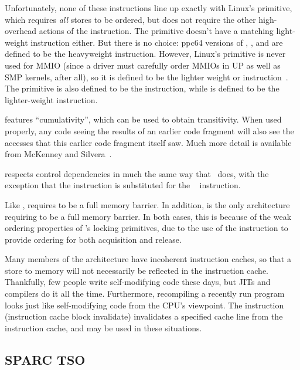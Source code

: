 Unfortunately, none of these instructions line up exactly with Linux's
 primitive, which requires \emph{all} stores to be ordered,
but does not require the other high-overhead actions of the 
instruction.
The  primitive doesn't have a matching light-weight instruction
either.
But there is no choice:
{ppc64} versions of , , and  are defined
to be the heavyweight  instruction.
However, Linux's  primitive is never used for MMIO
(since a driver must carefully order MMIOs in UP as well as
SMP kernels, after all), so it is defined to be the lighter weight
 or  instruction~\cite{PaulEMcKenney2016LinuxKernelMMIO}.
The  primitive is also defined to be the 
instruction, while  is defined to be the lighter-weight
 instruction.

\Power{} features ``cumulativity'', which can be used to obtain
transitivity.
When used properly, any code seeing the results of an earlier
code fragment will also see the accesses that this earlier code
fragment itself saw.
Much more detail is available from
McKenney and Silvera~\cite{PaulEMcKenneyN2745r2009}.

\Power{} respects control dependencies in much the same way that \ARM\
does, with the exception that the \Power{}  instruction
is substituted for the \ARM\ \co{ISB} instruction.

Like , \Power{} requires  to be
a full memory barrier.
In addition, \Power{} is the only architecture requiring
 to be a full memory barrier.
In both cases, this is because of the weak ordering properties
of \Power{}'s locking primitives, due to the use of the 
instruction to provide ordering for both acquisition and release.

Many members of the \Power{} architecture have incoherent instruction
caches, so that a store to memory will not necessarily be reflected
in the instruction cache.
Thankfully, few people write self-modifying code these days, but JITs
and compilers do it all the time.
Furthermore, recompiling a recently run program looks just like
self-modifying code from the CPU's viewpoint.
The  instruction (instruction cache block invalidate)
invalidates a specified cache line from
the instruction cache, and may be used in these situations.

\subsection{SPARC TSO}


